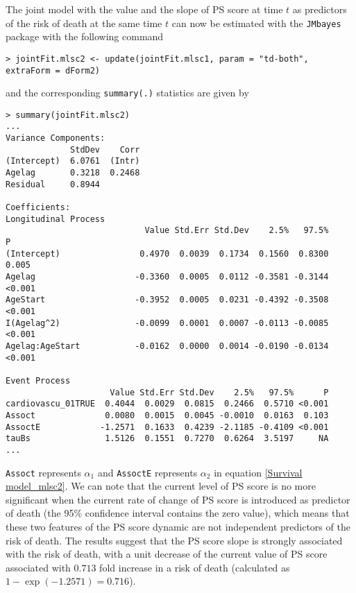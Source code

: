 \documentclass[12pt]{article}
\begin{document}
The joint model with the value and the slope of PS score at time $t$ as predictors of the risk of death at the same time $t$ can now be estimated with the \texttt{JMbayes} package with the following command
\begin{verbatim}
> jointFit.mlsc2 <- update(jointFit.mlsc1, param = "td-both", extraForm = dForm2)
\end{verbatim}
and the corresponding \texttt{summary(.)} statistics are given by 
\begin{verbatim}
> summary(jointFit.mlsc2)
...
Variance Components:
             StdDev    Corr
(Intercept)  6.0761  (Intr)
Agelag       0.3218  0.2468
Residual     0.8944        

Coefficients:
Longitudinal Process
                            Value Std.Err Std.Dev    2.5%   97.5%      P
(Intercept)                0.4970  0.0039  0.1734  0.1560  0.8300  0.005
Agelag                    -0.3360  0.0005  0.0112 -0.3581 -0.3144 <0.001
AgeStart                  -0.3952  0.0005  0.0231 -0.4392 -0.3508 <0.001
I(Agelag^2)               -0.0099  0.0001  0.0007 -0.0113 -0.0085 <0.001
Agelag:AgeStart           -0.0162  0.0000  0.0014 -0.0190 -0.0134 <0.001

Event Process
                     Value Std.Err Std.Dev    2.5%   97.5%      P
cardiovascu_01TRUE  0.4044  0.0029  0.0815  0.2466  0.5710 <0.001
Assoct              0.0080  0.0015  0.0045 -0.0010  0.0163  0.103
AssoctE            -1.2571  0.1633  0.4239 -2.1185 -0.4109 <0.001
tauBs               1.5126  0.1551  0.7270  0.6264  3.5197     NA
...
\end{verbatim}
\texttt{Assoct} represents $\alpha_1$ and \texttt{AssoctE} represents $\alpha_2$ in equation \eqref{Survival model_mlsc2}. We can note that the current level of PS score is no more significant when the current rate of change of PS score is introduced as predictor of death (the 95\% confidence interval contains the zero value), which means that these two features of the PS score dynamic are not independent predictors of the risk of death. The results suggest that the PS score slope is strongly associated with the risk of death, with a unit decrease of the current value of PS score associated with $0.713$ fold increase in a risk of death (calculated as $1-\exp (-1.2571)=0.716$).
\end{document}
